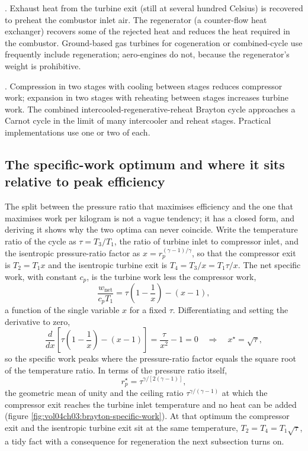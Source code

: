 . Exhaust heat from the turbine
exit (still at several hundred Celsius) is recovered to preheat the
combustor inlet air. The regenerator (a counter-flow heat exchanger)
recovers some of the rejected heat and reduces the heat required in
the combustor. Ground-based gas turbines for cogeneration or
combined-cycle use frequently include regeneration; aero-engines do
not, because the regenerator's weight is prohibitive.

. Compression in two stages
with cooling between stages reduces compressor work; expansion in
two stages with reheating between stages increases turbine work. The
combined intercooled-regenerative-reheat Brayton cycle approaches a
Carnot cycle in the limit of many intercooler and reheat stages.
Practical implementations use one or two of each.

\subsection{The specific-work optimum and where it sits relative to peak efficiency}

The split between the pressure ratio that maximises efficiency and the one
that maximises work per kilogram is not a vague tendency; it has a closed
form, and deriving it shows why the two optima can never coincide. Write
the temperature ratio of the cycle as $\tau = T_3/T_1$, the ratio of
turbine inlet to compressor inlet, and the isentropic pressure-ratio factor
as $x = r_p^{(\gamma-1)/\gamma}$, so that the compressor exit is $T_2 = T_1
x$ and the isentropic turbine exit is $T_4 = T_3/x = T_1 \tau/x$. The net
specific work, with constant $c_p$, is the turbine work less the compressor
work,
\[
\frac{w_{\text{net}}}{c_p T_1} = \tau\!\left(1 - \frac{1}{x}\right) -
(x - 1),
\]
a function of the single variable $x$ for a fixed $\tau$. Differentiating
and setting the derivative to zero,
\[
\frac{d}{dx}\!\left[\tau\!\left(1 - \frac{1}{x}\right) - (x - 1)\right]
= \frac{\tau}{x^2} - 1 = 0
\quad\Longrightarrow\quad x^\star = \sqrt{\tau},
\]
so the specific work peaks where the pressure-ratio factor equals the
square root of the temperature ratio. In terms of the pressure ratio
itself,
\[
r_p^\star = \tau^{\gamma/[2(\gamma-1)]},
\]
the geometric mean of unity and the ceiling ratio $\tau^{\gamma/(\gamma-1)}$
at which the compressor exit reaches the turbine inlet temperature and no
heat can be added (figure \ref{fig:vol04ch03:brayton-specific-work}). At
that optimum the compressor exit and the isentropic turbine exit sit at the
same temperature, $T_2 = T_4 = T_1\sqrt{\tau}$, a tidy fact with a
consequence for regeneration the next subsection turns on.

